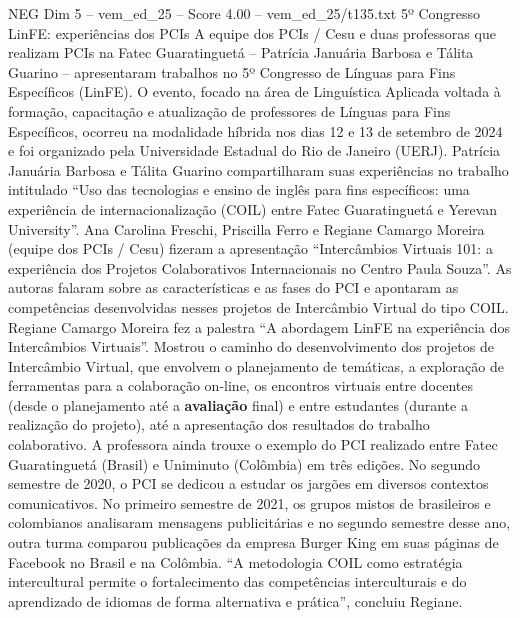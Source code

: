 \begin{textsample}{NEG Dim 5 – vem\_ed\_25 – Score 4.00 – vem\_ed\_25/t135.txt}  \label{ex:f5_neg_157}
5º Congresso LinFE: experiências dos PCIs A equipe dos PCIs / Cesu e duas professoras que realizam PCIs na Fatec Guaratinguetá – Patrícia Januária Barbosa e Tálita Guarino – apresentaram trabalhos no 5º Congresso de Línguas para Fins Específicos (LinFE).
O evento, focado na área de Linguística Aplicada voltada à formação, capacitação e atualização de professores de Línguas para Fins Específicos, ocorreu na modalidade híbrida nos dias 12 e 13 de setembro de 2024 e foi organizado pela Universidade Estadual do Rio de Janeiro (UERJ).
Patrícia Januária Barbosa e Tálita Guarino compartilharam suas experiências no trabalho intitulado “Uso das tecnologias e ensino de inglês para fins específicos: uma experiência de internacionalização (COIL) entre Fatec Guaratinguetá e Yerevan University”.
Ana Carolina Freschi, Priscilla Ferro e Regiane Camargo Moreira (equipe dos PCIs / Cesu) fizeram a apresentação “Intercâmbios Virtuais 101: a experiência dos Projetos Colaborativos Internacionais no Centro Paula Souza”.
As autoras falaram sobre as características e as fases do PCI e apontaram as competências desenvolvidas nesses projetos de Intercâmbio Virtual do tipo COIL.
Regiane Camargo Moreira fez a palestra “A abordagem LinFE na experiência dos Intercâmbios Virtuais”.
Mostrou o caminho do desenvolvimento dos projetos de Intercâmbio Virtual, que envolvem o planejamento de temáticas, a exploração de ferramentas para a colaboração on-line, os encontros virtuais entre docentes (desde o planejamento até a \textbf{avaliação} final) e entre estudantes (durante a realização do projeto), até a apresentação dos resultados do trabalho colaborativo.
A professora ainda trouxe o exemplo do PCI realizado entre Fatec Guaratinguetá (Brasil) e Uniminuto (Colômbia) em três edições.
No segundo semestre de 2020, o PCI se dedicou a estudar os jargões em diversos contextos comunicativos.
No primeiro semestre de 2021, os grupos mistos de brasileiros e colombianos analisaram mensagens publicitárias e no segundo semestre desse ano, outra turma comparou publicações da empresa Burger King em suas páginas de Facebook no Brasil e na Colômbia. “A metodologia COIL como estratégia intercultural permite o fortalecimento das competências interculturais e do aprendizado de idiomas de forma alternativa e prática”, concluiu Regiane.

\end{textsample}
